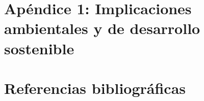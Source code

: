 \documentclass[12pt,letterpaper,oneside]{article}
\begin{document}


\setcounter{page}{2}

\section*{Apéndice 1: Implicaciones ambientales y de desarrollo sostenible}



\section*{Referencias bibliográficas}

\printbibliography[heading=none]
\end{document}
